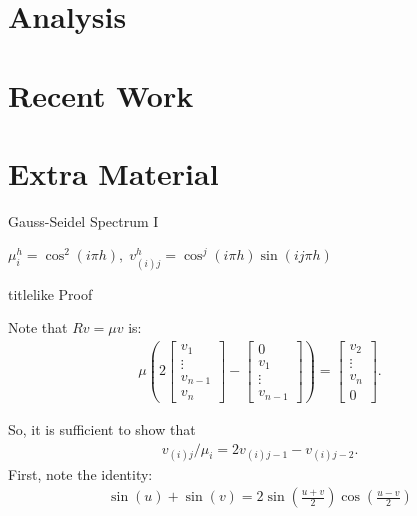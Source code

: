 \documentclass{beamer}
\begin{document}
\section{Analysis}%

\section{Recent Work}%

\section*{Extra Material}%

\begin{frame}[label=gaussSeidelProof]{Gauss-Seidel Spectrum I}
 \begin{theorem}
  $\mu_i^h = \cos^2(i\pi h), \; v_{(i)j}^h = \cos^j(i\pi h)\sin(ij\pi h)$
 \end{theorem}
  \begin{beamercolorbox}{titlelike}
   Proof
  \end{beamercolorbox}
  
  Note that $Rv=\mu v$ is:
  \begin{align}
   \mu\left(2 \begin{bmatrix}v_1\\ \vdots \\ v_{n-1} \\ v_n \end{bmatrix} - \begin{bmatrix} 0 \\ v_1 \\ \vdots \\ v_{n-1} \end{bmatrix} \right) = \begin{bmatrix}v_2\\ \vdots \\ v_n \\ 0\end{bmatrix}.
  \end{align}

  So, it is sufficient to show that
  \begin{align}
   v_{(i)j}/\mu_i = 2v_{(i)j-1} - v_{(i)j-2}. \nonumber
  \end{align}
  First, note the identity:
  \begin{align}
   \sin(u)+\sin(v) = 2\sin\left(\frac{u+v}{2}\right)\cos\left(\frac{u-v}{2}\right) \nonumber
  \end{align}
\end{frame}
\end{document}
